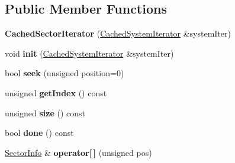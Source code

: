 \subsection*{Public Member Functions}
\begin{DoxyCompactItemize}
\item 
{\bfseries Cached\+Sector\+Iterator} (\hyperlink{classNavigationSystem_1_1CachedSystemIterator}{Cached\+System\+Iterator} \&system\+Iter)\hypertarget{classNavigationSystem_1_1CachedSectorIterator_a920c6d31602f97b0b4a6b3f55bc080fb}{}\label{classNavigationSystem_1_1CachedSectorIterator_a920c6d31602f97b0b4a6b3f55bc080fb}

\item 
void {\bfseries init} (\hyperlink{classNavigationSystem_1_1CachedSystemIterator}{Cached\+System\+Iterator} \&system\+Iter)\hypertarget{classNavigationSystem_1_1CachedSectorIterator_ac030cc2a0fbc068d89c4821b48077c86}{}\label{classNavigationSystem_1_1CachedSectorIterator_ac030cc2a0fbc068d89c4821b48077c86}

\item 
bool {\bfseries seek} (unsigned position=0)\hypertarget{classNavigationSystem_1_1CachedSectorIterator_af64c4a535b8c327fb11fd6bc58b09d82}{}\label{classNavigationSystem_1_1CachedSectorIterator_af64c4a535b8c327fb11fd6bc58b09d82}

\item 
unsigned {\bfseries get\+Index} () const \hypertarget{classNavigationSystem_1_1CachedSectorIterator_a1e550897c1df43a8c843bd948d5f3944}{}\label{classNavigationSystem_1_1CachedSectorIterator_a1e550897c1df43a8c843bd948d5f3944}

\item 
unsigned {\bfseries size} () const \hypertarget{classNavigationSystem_1_1CachedSectorIterator_a08bd1a9eef79cc0c692e9306a375a6f6}{}\label{classNavigationSystem_1_1CachedSectorIterator_a08bd1a9eef79cc0c692e9306a375a6f6}

\item 
bool {\bfseries done} () const \hypertarget{classNavigationSystem_1_1CachedSectorIterator_a128a74df513714a0b49a12d6be45c8c1}{}\label{classNavigationSystem_1_1CachedSectorIterator_a128a74df513714a0b49a12d6be45c8c1}

\item 
\hyperlink{classNavigationSystem_1_1CachedSectorIterator_1_1SectorInfo}{Sector\+Info} \& {\bfseries operator\mbox{[}$\,$\mbox{]}} (unsigned pos)\hypertarget{classNavigationSystem_1_1CachedSectorIterator_aad69180888d7114470a32ae28c959b4c}{}\label{classNavigationSystem_1_1CachedSectorIterator_aad69180888d7114470a32ae28c959b4c}


\end{DoxyCompactItemize}
